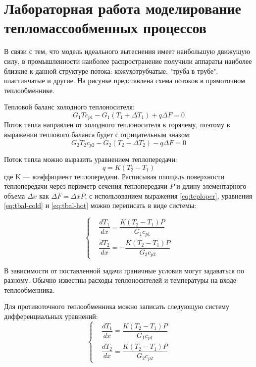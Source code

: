 \section*{Лабораторная работа моделирование тепломассообменных процессов}

В связи с тем, что модель идеального вытеснения имеет наибольшую движущую силу, в промышленности наиболее распространение получили аппараты наиболее близкие к данной структуре потока: кожухотрубчатые, "труба в трубе", пластинчатые и другие. На рисунке представлена схема потоков в прямоточном теплообменнике. 

Тепловой баланс холодного теплоносителя:
\begin{equation}\label{eq:tbal-cold}
	G_1 T c_{p1}-G_1 (T_1+\Delta T_1) + q \Delta F=0
\end{equation}
Поток тепла направлен от холодного теплоносителя к горячему, поэтому в выражении теплового баланса будет с отрицательным знаком:
\begin{equation}\label{eq:tbal-hot}
	G_2 T_2 c_{p2} -G_2 (T_2 - \Delta T_2) -q \Delta F =0
\end{equation}

Поток тепла можно выразить уравнением теплопередачи:
\begin{equation}\label{eq:teploper}
	q=K(T_2-T_1)
\end{equation}
где K --- коэффициент теплопередачи. Расписывая площадь поверхности теплопередачи через периметр сечения теплопередачи $P$ и длину элементарного объема $\Delta x$ как $\Delta F = \Delta x P$, с использованием выражения \ref{eq:teploper}, уравнения \ref{eq:tbal-cold} и \ref{eq:tbal-hot} можно переписать в виде системы:

 \begin{equation}
 \left\{
 \begin{aligned}
 &\dfrac{dT_1}{dx}=\dfrac{K(T_2-T_1)P}{G_1 c_{p1}}        \\
 &\dfrac{dT_2}{dx}=-\dfrac{K(T_2-T_1)P}{G_2 c_{p2}}            
 \end{aligned}
 \right.
 \end{equation}

В зависимости от поставленной задачи граничные условия могут задаваться по разному. Обычно известны расходы теплоносителей и температуры на входе теплообменника.

Для противоточного теплообменника можно записать следующую систему дифференциальных уравнений:
 \begin{equation}
 \left\{
 \begin{aligned}
 &\dfrac{dT_1}{dx}=\dfrac{K(T_2-T_1)P}{G_1 c_{p1}}        \\
 &\dfrac{dT_2}{dx}=\dfrac{K(T_2-T_1)P}{G_2 c_{p2}}            
 \end{aligned}
 \right.
 \end{equation}
 
